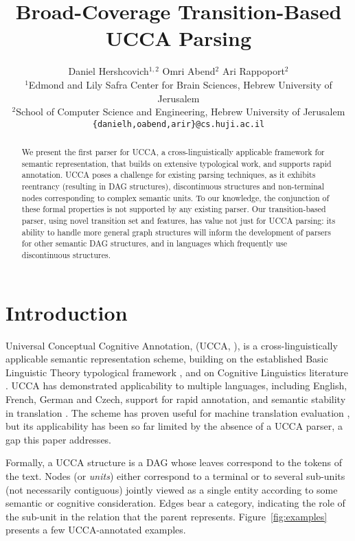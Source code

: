 \documentclass[11pt,a4paper]{article}
\title{Broad-Coverage Transition-Based UCCA Parsing}
\author{Daniel Hershcovich$^{1,2}$ \And Omri Abend$^2$ \And Ari Rappoport$^2$ \\
  $^1$Edmond and Lily Safra Center for Brain Sciences, Hebrew University of Jerusalem \\
  $^2$School of Computer Science and Engineering, Hebrew University of Jerusalem \\
  \texttt{\{danielh,oabend,arir\}@cs.huji.ac.il}
}
\date{}
\newcommand{\figref}[1]{Figure~\ref{#1}}
\begin{document}
\maketitle

\begin{abstract}
  We present the first parser for UCCA, a
  cross-linguistically applicable framework for semantic
  representation, that builds on extensive
  typological work, and supports rapid annotation.
  UCCA poses a challenge for existing parsing techniques,
  as it exhibits reentrancy (resulting in DAG structures),
  discontinuous structures and non-terminal nodes corresponding
  to complex semantic units. To our knowledge, the conjunction
  of these formal properties is not supported by any existing parser.
  Our transition-based parser, using novel transition set
  and features, has value not just for UCCA parsing:
  its ability to handle more general graph structures will inform
  the development of parsers for other semantic DAG structures, 
  and in languages which frequently use discontinuous structures.
\end{abstract}


\section{Introduction}\label{sec:introduction}

Universal Conceptual Cognitive Annotation, (UCCA, \citet{abend2013universal}),
is a cross-linguistically applicable semantic representation scheme,
building on the established Basic Linguistic Theory typological framework
\cite{Dixon:10b,Dixon:10a,Dixon:12}, and on Cognitive
Linguistics literature \cite{croft2004cognitive}.
UCCA has demonstrated applicability to multiple languages, including
English, French, German and Czech, support for rapid annotation,
and semantic stability in translation \cite{sulem2015conceptual}.
The scheme has proven useful for machine translation evaluation \cite{birch2016hume},
but its applicability has been so far limited by the absence of a UCCA parser,
a gap this paper addresses.

Formally, a UCCA structure is a DAG whose leaves correspond to the tokens of
the text. Nodes (or {\it units}) either correspond to a terminal or
to several sub-units (not necessarily contiguous) jointly viewed as a
single entity according to some semantic or cognitive consideration.
Edges bear a category, indicating the role of the sub-unit in the relation
that the parent represents. \figref{fig:examples} presents a few UCCA-annotated examples.
\end{document}
